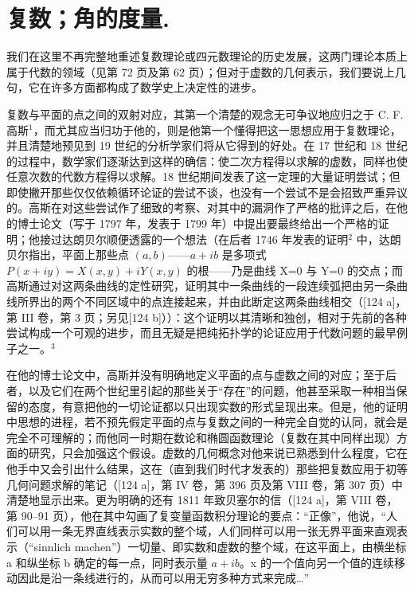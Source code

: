 \chapter{复数；角的度量.}

我们在这里不再完整地重述复数理论或四元数理论的历史发展，这两门理论本质上属于代数的领域（见第 72 页及第 62 页）；但对于虚数的几何表示，我们要说上几句，它在许多方面都构成了数学史上决定性的进步。

复数与平面的点之间的双射对应，其第一个清楚的观念无可争议地应归之于 C. F. 高斯\(^{1}\)，而尤其应当归功于他的，则是他第一个懂得把这一思想应用于复数理论，并且清楚地预见到 19 世纪的分析学家们将从它得到的好处。在 17 世纪和 18 世纪的过程中，数学家们逐渐达到这样的确信：使二次方程得以求解的虚数，同样也使任意次数的代数方程得以求解。18 世纪期间发表了这一定理的大量证明尝试；但即使撇开那些仅仅依赖循环论证的尝试不谈，也没有一个尝试不是会招致严重异议的。高斯在对这些尝试作了细致的考察、对其中的漏洞作了严格的批评之后，在他的博士论文（写于 1797 年，发表于 1799 年）中提出要最终给出一个严格的证明；他接过达朗贝尔顺便透露的一个想法（在后者 1746 年发表的证明\(^{2}\) 中，达朗贝尔指出，平面上那些点 \((a,b)\)——\(a+ib\) 是多项式 \(P(x+iy)=X(x,y)+iY(x,y)\) 的根——乃是曲线 X=0 与 Y=0 的交点；而高斯通过对这两条曲线的定性研究，证明其中一条曲线的一段连续弧把由另一条曲线所界出的两个不同区域中的点连接起来，并由此断定这两条曲线相交（{[}124 a{]}，第 III 卷，第 3 页；另见{[}124 b{]}））：这个证明以其清晰和独创，相对于先前的各种尝试构成一个可观的进步，而且无疑是把纯拓扑学的论证应用于代数问题的最早例子之一。\(^{3}\)

在他的博士论文中，高斯并没有明确地定义平面的点与虚数之间的对应；至于后者，以及它们在两个世纪里引起的那些关于“存在”的问题，他甚至采取一种相当保留的态度，有意把他的一切论证都以只出现实数的形式呈现出来。但是，他的证明中思想的进程，若不预先假定平面的点与复数之间的一种完全自觉的认同，就会是完全不可理解的；而他同一时期在数论和椭圆函数理论（复数在其中同样出现）方面的研究，只会加强这个假设。虚数的几何概念对他来说已熟悉到什么程度，它在他手中又会引出什么结果，这在（直到我们时代才发表的）那些把复数应用于初等几何问题求解的笔记（{[}124 a{]}，第 IV 卷，第 396 页及第 VIII 卷，第 307 页）中清楚地显示出来。更为明确的还有 1811 年致贝塞尔的信（{[}124 a{]}，第 VIII 卷，第 90–91 页），他在其中勾画了复变量函数积分理论的要点：“正像”，他说，“人们可以用一条无界直线表示实数的整个域，人们同样可以用一张无界平面来直观表示（“sinnlich machen”）一切量、即实数和虚数的整个域，在这平面上，由横坐标 a 和纵坐标 b 确定的每一点，同时表示量 \(a + ib\)。x 的一个值向另一个值的连续移动因此是沿一条线进行的，从而可以用无穷多种方式来完成\ldots”

